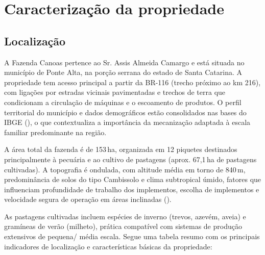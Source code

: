 \documentclass[12pt,openright,oneside,a4paper,hidelinks,espacamento=1.5]{abntex2}
\begin{document}



\chapter{Caracterização da propriedade}



\section{Localização}
A Fazenda Canoas pertence ao Sr. Assis Almeida Camargo e está situada no município de Ponte Alta, na porção serrana do estado de Santa Catarina. A propriedade tem acesso principal a partir da BR-116 (trecho próximo ao km 216), com ligações por estradas vicinais pavimentadas e trechos de terra que condicionam a circulação de máquinas e o escoamento de produtos. O perfil territorial do município e dados demográficos estão consolidados nas bases do IBGE (), o que contextualiza a importância da mecanização adaptada à escala familiar predominante na região. 
\par A área total da fazenda é de 153\,ha, organizada em 12 piquetes destinados principalmente à pecuária e ao cultivo de pastagens (aprox. 67,1\,ha de pastagens cultivadas). A topografia é ondulada, com altitude média em torno de 840\,m, predominância de solos do tipo Cambissolo e clima subtropical úmido, fatores que influenciam profundidade de trabalho dos implementos, escolha de implementos e velocidade segura de operação em áreas inclinadas (). 
\par As pastagens cultivadas incluem espécies de inverno (trevos, azevém, aveia) e gramíneas de verão (milheto), prática compatível com sistemas de produção extensivos de pequena/ média escala.
Segue uma tabela resumo com os principais indicadores de localização e características básicas da propriedade:
\end{document}
